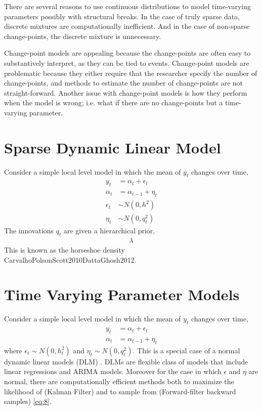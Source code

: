 \documentclass{article}
\begin{document}
There are several reasons to use continuous distributions to model time-varying parameters possibly with structural breaks.
In the case of truly sparse data, discrete mixtures are computationally inefficient. 
And in the case of non-sparse change-points, the discrete mixture is unnecessary.

Change-point models are appealing because the change-points are often easy to substantively interpret, as they can be tied to events.
Change-point models are problematic because they either require that the researcher specify the number of change-points, and methods to estimate the number of change-points are not straight-forward.
Another issue with change-point models is how they perform when the model is wrong; i.e. what if there are no change-points but a time-varying parameter.

\section{Sparse Dynamic Linear Model}

Consider a simple local level model in which the mean of $y_{t}$ changes over time,
\begin{align}
  \label{eq:8}
  y_t &= \alpha_t + \epsilon_t \\
  \alpha_t &= \alpha_{t-1} + \eta_{t} \\
  \epsilon_{t} &\sim N(0, h^{2}) \\
  \eta_{t} &\sim N(0, q_{t}^{2})
\end{align}
The innovations $q_{t}$ are given a hierarchical prior,
\begin{align}
  \label{eq:4}
  \lambda^{}
\end{align}
This is known as the horseshoe density \textcite{CarvalhoPolsonScott2009}{CarvalhoPolsonScott2010}{DattaGhosh2012}.


\section{Time Varying Parameter Models}
\label{sec:time-vary-param}

Consider a simple local level model in which the mean of $y_{t}$ changes over time,
\begin{equation}
  \label{eq:8}
  \begin{aligned}
    y_t &= \alpha_t + \epsilon_t \\
    \alpha_t &= \alpha_{t-1} + \eta_{t}
  \end{aligned}
\end{equation}
where $\epsilon_{t} \sim N(0, h_{t}^{2})$ and $\eta_{t} \sim N(0, q_{t}^{2})$.
This is a special case of a normal dynamic linear models (DLM) \parencites{WestHarrison1997}{DurbinKoopman2012}{CommandeurKoopman2007}{ShumwayStoffer2010}.
DLMs are flexible class of models that include linear regressions and ARIMA models.
Moreover for the case in which $\epsilon$ and $\eta$ are normal, there are computationally efficient methods both to maximize the likelihood of (Kalman Filter) and to sample from (Forward-filter backward samples) \eqref{eq:8}.
\end{document}
